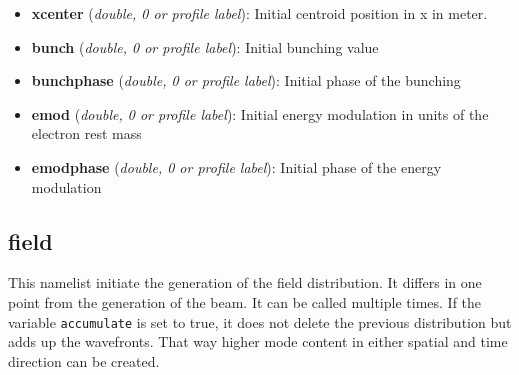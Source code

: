 \documentclass[12pt]{book}
\begin{document}
\begin{itemize}
\item {\bf xcenter} ({\it double, 0 or profile label}): Initial centroid position in x in meter.
\item {\bf bunch} ({\it double, 0 or profile label}): Initial bunching value
\item {\bf bunchphase} ({\it double, 0 or profile label}): Initial phase of the bunching
\item {\bf emod} ({\it double, 0 or profile label}): Initial energy modulation in units of the electron rest mass
\item {\bf emodphase} ({\it double, 0 or profile label}): Initial phase of the energy modulation

\end{itemize}


\subsection{\sf field}
This namelist initiate the generation of the field distribution. It differs in one point from the generation of the beam. It can be called multiple times. If the variable {\tt accumulate} is set to true, it does not delete the previous distribution but adds up the wavefronts. That way higher mode content in either spatial and time direction can be created.
\end{document}
